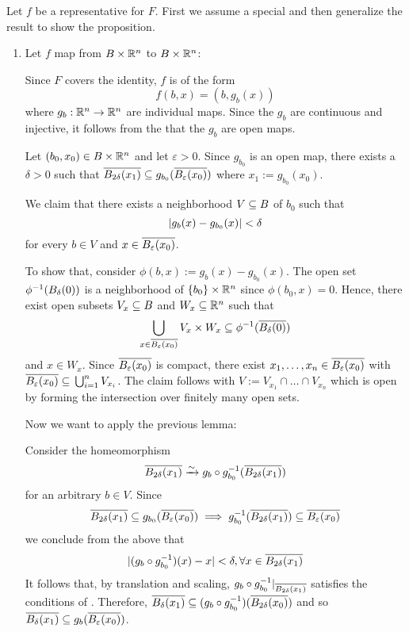 \begin{myproof}
    Let $f$ be a representative for $F$.
    First we assume a special and then generalize the result to show the proposition.
    \begin{enumerate}
        \item Let $f$ map from $B \times \mathbb{R}^n$ to $B \times \mathbb{R}^n$:
        
        Since $F$ covers the identity, $f$ is of the form
        \[ f(b, x) = (b, g_b(x)) \]
        where $g_b: \mathbb{R}^n \to \mathbb{R}^n$ are individual maps.
        Since the $g_b$ are continuous and injective, it follows from the  that the $g_b$ are open maps.
        
        Let $(b_0, x_0) \in B \times \mathbb{R}^n$ and let $\varepsilon > 0$.
        Since $g_{b_0}$ is an open map, there exists a $\delta > 0$ such that
        $\clball[2\delta][x_1] \sub g_{b_0}(\clball[\varepsilon][x_0])$ where $x_1 := g_{b_0}(x_0)$.

        We claim that there exists a neighborhood $V \subseteq{} B$ of $b_0$ such that
        \[ \vert{} g_b(x) - g_{b_0}(x) \vert{} < \delta \]
        for every $b \in V$ and $x \in \clball[\varepsilon][x_0]$.
        
        To show that, consider $\phi(b, x) := g_b(x) - g_{b_0}(x)$.
        The open set $\phi^{-1}(\ball[\delta])$ is a neighborhood of $\{b_0\} \times \mathbb{R}^n$ since $\phi(b_0, x) = 0$.
        Hence, there exist open subsets $V_x \subseteq{} B$ and $W_x \subseteq{} \mathbb{R}^n$ such that
        \[ \bigcup_{x \in \clball[\varepsilon][x_0]} V_x \times W_x \sub \inv{\phi}(\clball[\delta]) \]
        and $x \in W_x$.
        Since $\clball[\varepsilon][x_0]$ is compact, there exist $x_1, \dots, x_n \in \clball[\varepsilon][x_0]$ with $\clball[\varepsilon][x_0] \sub \bigcup_{i = 1}^{n} V_{x_i}$.
        The claim follows with $V := V_{x_1} \cap \dots \cap V_{x_n}$ which is open by forming the intersection over finitely many open sets.

        Now we want to apply the previous lemma:

        Consider the homeomorphism
        \[ \clball[2\delta][x_1] \isomto g_b \circ \inv{g_{b_0}}(\clball[2\delta][x_1]) \]
        for an arbitrary $b \in V$.
        Since
        \[ \clball[2\delta][x_1] \sub g_{b_0}(\clball[\varepsilon][x_0]) \implies g_{b_0}^{-1}(\clball[2\delta][x_1]) \sub \clball[\varepsilon][x_0] \]
        we conclude from the above that
        \[ \abs{(g_b \circ g_{b_0}^{-1})(x) - x} < \delta, \forall x \in \clball[2\delta][x_1] \]
        It follows that, by translation and scaling, $g_b \circ g_{b_0}^{-1}\restr{\clball[2\delta][x_1]}$ satisfies the conditions of .
        Therefore, $\clball[\delta][x_1] \sub (g_b \circ g_{b_0}^{-1})(\clball[2\delta][x_0])$ and so $\clball[\delta][x_1] \sub g_b(\clball[\varepsilon][x_0])$.


\end{enumerate}
\end{myproof}
